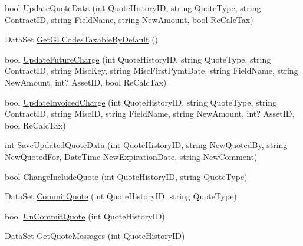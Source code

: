 \begin{DoxyCompactItemize}
\item 
bool \mbox{\hyperlink{interface_g_f_s_c_1_1_services_1_1_end_of_term_1_1_i_end_of_term_service_aceeb0be19b43bf22aa06d2428aa4a580}{Update\+Quote\+Data}} (int Quote\+History\+ID, string Quote\+Type, string Contract\+ID, string Field\+Name, string New\+Amount, bool Re\+Calc\+Tax)
\item 
Data\+Set \mbox{\hyperlink{interface_g_f_s_c_1_1_services_1_1_end_of_term_1_1_i_end_of_term_service_a8b6ecde00a9c6c73a5d3b1cdb63dd98a}{Get\+G\+L\+Codes\+Taxable\+By\+Default}} ()
\item 
bool \mbox{\hyperlink{interface_g_f_s_c_1_1_services_1_1_end_of_term_1_1_i_end_of_term_service_ac77b6e06f13fe19ff8d6eafc169f2132}{Update\+Future\+Charge}} (int Quote\+History\+ID, string Quote\+Type, string Contract\+ID, string Misc\+Key, string Misc\+First\+Pymt\+Date, string Field\+Name, string New\+Amount, int? Asset\+ID, bool Re\+Calc\+Tax)
\item 
bool \mbox{\hyperlink{interface_g_f_s_c_1_1_services_1_1_end_of_term_1_1_i_end_of_term_service_a5b115cb97ef54114fea39414cf521207}{Update\+Invoiced\+Charge}} (int Quote\+History\+ID, string Quote\+Type, string Contract\+ID, string Misc\+ID, string Field\+Name, string New\+Amount, int? Asset\+ID, bool Re\+Calc\+Tax)
\item 
int \mbox{\hyperlink{interface_g_f_s_c_1_1_services_1_1_end_of_term_1_1_i_end_of_term_service_aa737f02391b7bf664bbd6f0e21f57a64}{Save\+Updated\+Quote\+Data}} (int Quote\+History\+ID, string New\+Quoted\+By, string New\+Quoted\+For, Date\+Time New\+Expiration\+Date, string New\+Comment)
\item 
bool \mbox{\hyperlink{interface_g_f_s_c_1_1_services_1_1_end_of_term_1_1_i_end_of_term_service_a2eac908a57f89e40f6ebab356ee6f665}{Change\+Include\+Quote}} (int Quote\+History\+ID, string Quote\+Type)
\item 
Data\+Set \mbox{\hyperlink{interface_g_f_s_c_1_1_services_1_1_end_of_term_1_1_i_end_of_term_service_a6293c982b7f6c9527077662807544d07}{Commit\+Quote}} (int Quote\+History\+ID, string Quote\+Type)
\item 
bool \mbox{\hyperlink{interface_g_f_s_c_1_1_services_1_1_end_of_term_1_1_i_end_of_term_service_acd3f4ada554c2fa73b6e9eeaf4d73d69}{Un\+Commit\+Quote}} (int Quote\+History\+ID)
\item 
Data\+Set \mbox{\hyperlink{interface_g_f_s_c_1_1_services_1_1_end_of_term_1_1_i_end_of_term_service_a8e86e5647676ef7bb7f58295d52bc322}{Get\+Quote\+Messages}} (int Quote\+History\+ID)
\item 

\end{DoxyCompactItemize}
